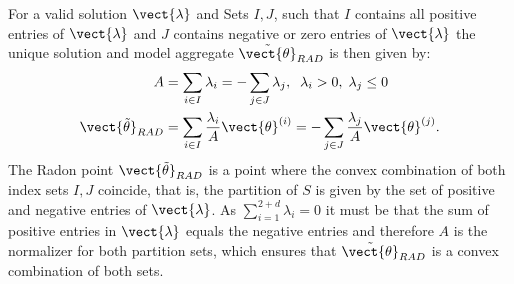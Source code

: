 For a valid solution $\vect{\lambda}$ and Sets $I,J$, such that $I$ contains all positive entries of $\vect{\lambda}$ and $J$ contains negative or zero entries of $\vect{\lambda}$ the unique solution and model aggregate $\tilde{\vect{\theta}}_{RAD}$ is then given by:
\begin{equation}
    \label{eq:radonpoint}
    \begin{split}
    A &= \sum_{i\in I} \lambda_i = - \sum_{j\in J} \lambda_j, \; \;\lambda_i > 0, \; \lambda_j \leq 0 \\
    \vect{\tilde{\theta}}_{RAD} &= \sum_{i\in I} \frac{\lambda_i}{A} \vect{\theta}^{(i)} = - \sum_{j\in J} \frac{\lambda_j}{A} \vect{\theta}^{(j)}.
    \end{split}
\end{equation}
The Radon point $\vect{\tilde{\theta}}_{RAD}$ is a point where the convex combination of both index sets $I, J$ coincide, that is, the partition of $S$ is given by the set of positive and negative entries of $\vect{\lambda}$.
As $\sum_{i=1}^{2+d} \lambda_i = 0$ it must be that the sum of positive entries in $\vect{\lambda}$ equals the negative entries and therefore $A$ is the normalizer for both partition sets, which ensures that $\tilde{\vect{\theta}}_{RAD}$ is a convex combination of both sets.

